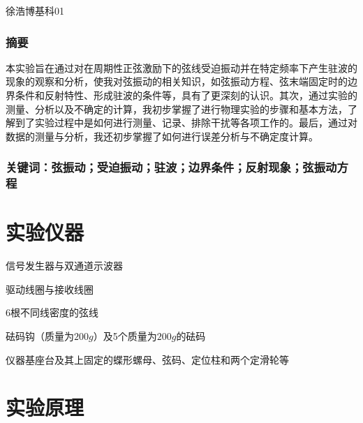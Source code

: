 \documentclass[UTF8]{ctexart}
\begin{document}
\linespread{1.4}
\title{\vspace{-5em}\vspace{-2.5em}}
\date{}
\maketitle
\begin{center}
{\fangsong 徐浩博\quad 基科01}
\end{center}

\subsubsection*{摘要}
\kaishu\normalsize 本实验旨在通过对在周期性正弦激励下的弦线受迫振动并在特定频率下产生驻波的现象的观察和分析，使我对弦振动的相关知识，如弦振动方程、弦末端固定时的边界条件和反射特性、形成驻波的条件等，具有了更深刻的认识。其次，通过实验的测量、分析以及不确定的计算，我初步掌握了进行物理实验的步骤和基本方法，了解到了实验过程中是如何进行测量、记录、排除干扰等各项工作的。最后，通过对数据的测量与分析，我还初步掌握了如何进行误差分析与不确定度计算。
\subsubsection*{关键词：弦振动；受迫振动；驻波；边界条件；反射现象；弦振动方程\vspace{1.5em}}


\section{实验仪器}
\songti 信号发生器与双通道示波器\par 驱动线圈与接收线圈\par 6根不同线密度的弦线\par 砝码钩（质量为$200g$）及5个质量为$200g$的砝码\par 仪器基座台及其上固定的蝶形螺母、弦码、定位柱和两个定滑轮等\par


\section{实验原理}
\end{document}

